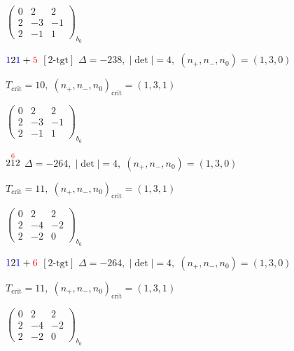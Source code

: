 \documentclass[10pt]{article}
\begin{document}
\hspace{2em}$\left(\begin{smallmatrix}0 & 2 & 2 \\ 2 & -3 & -1 \\ 2 & -1 & 1\end{smallmatrix}\right)_{\!b_0}$

\smallskip

$\textcolor{blue}{1}2\textcolor{blue}{1}+\textcolor{red}{5}$ $\scriptstyle [2\text{-tgt}]$ \quad $\Delta=-238,\; |\det|=4,\; (n_+,n_-,n_0)=(1,3,0)$

\hspace{1em}$T_{\text{crit}}=10,\; (n_+,n_-,n_0)_{\text{crit}}=(1,3,1)$

\hspace{2em}$\left(\begin{smallmatrix}0 & 2 & 2 \\ 2 & -3 & -1 \\ 2 & -1 & 1\end{smallmatrix}\right)_{\!b_0}$

\smallskip

$2\overset{\textcolor{red}{6}}{1}2$ \quad $\Delta=-264,\; |\det|=4,\; (n_+,n_-,n_0)=(1,3,0)$

\hspace{1em}$T_{\text{crit}}=11,\; (n_+,n_-,n_0)_{\text{crit}}=(1,3,1)$

\hspace{2em}$\left(\begin{smallmatrix}0 & 2 & 2 \\ 2 & -4 & -2 \\ 2 & -2 & 0\end{smallmatrix}\right)_{\!b_0}$

\smallskip

$\textcolor{blue}{1}2\textcolor{blue}{1}+\textcolor{red}{6}$ $\scriptstyle [2\text{-tgt}]$ \quad $\Delta=-264,\; |\det|=4,\; (n_+,n_-,n_0)=(1,3,0)$

\hspace{1em}$T_{\text{crit}}=11,\; (n_+,n_-,n_0)_{\text{crit}}=(1,3,1)$

\hspace{2em}$\left(\begin{smallmatrix}0 & 2 & 2 \\ 2 & -4 & -2 \\ 2 & -2 & 0\end{smallmatrix}\right)_{\!b_0}$
\end{document}
